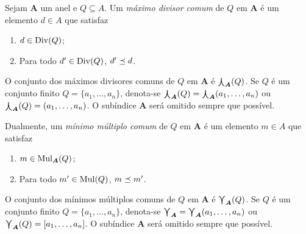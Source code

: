 

\begin{definition}
Sejam $\bm A$ um anel e $Q \subseteq A$. Um \emph{máximo divisor comum} de $Q$ em $\bm A$ é um elemento $d \in A$ que satisfaz
	\begin{enumerate}
	\item $d \in \operatorname{Div}(Q)$;
	\item Para todo $d' \in \operatorname{Div}(Q)$, $d' \preceq d$.
	\end{enumerate}
O conjunto dos máximos divisores comuns de $Q$ em $\bm A$ é $\mathop{\bigcurlywedge}_{\bm A}(Q)$. Se $Q$ é um conjunto finito $Q=\{a_1,\ldots,a_n\}$, denota-se	$\mathop{\bigcurlywedge}_{\bm A}(Q)=\mathop{\bigcurlywedge}_{\bm A}(a_1,\ldots,a_n)$ ou $\mathop{\bigcurlywedge}_{\bm A}(Q)=(a_1,\ldots,a_n)$. O subíndice $\bm A$ será omitido sempre que possível.

Dualmente, um \emph{mínimo múltiplo comum} de $Q$ em $\bm A$ é um elemento $m \in A$ que satisfaz
	\begin{enumerate}
	\item $m \in \operatorname{Mul}_{\bm A}(Q)$;
	\item Para todo $m' \in \operatorname{Mul}(Q)$, $m \preceq m'$.
	\end{enumerate}
	O conjunto dos mínimos múltiplos comuns de $Q$ em $\bm A$ é $\mathop{\bigcurlyvee}_{\bm A}(Q)$. Se $Q$ é um conjunto finito $Q=\{a_1, \ldots, a_n\}$, denota-se $\mathop{\bigcurlyvee}_{\bm A} = \mathop{\bigcurlyvee}_{\bm A}(a_1, \ldots, a_n)$ ou $\mathop{\bigcurlyvee}_{\bm A}(Q) = [a_1, \ldots, a_n]$. O subíndice $\bm A$ será omitido sempre que possível.
\end{definition}

